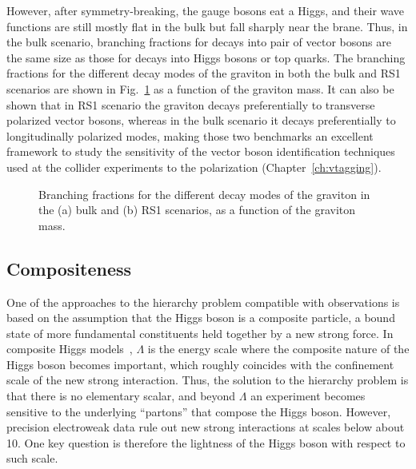 However, after symmetry-breaking, the gauge bosons eat a Higgs, and their wave functions are still mostly flat in the bulk but fall sharply near the brane.
Thus, in the bulk scenario, branching fractions for decays into pair of vector bosons are the same size as those for decays into Higgs bosons or top quarks.
The branching fractions for the different decay modes of the graviton in both the bulk and RS1 scenarios are shown in Fig.~\ref{fig:GrBR} as a function of the graviton mass.
It can also be shown that in RS1 scenario the graviton decays preferentially to transverse polarized vector bosons, whereas in the bulk scenario it decays preferentially to longitudinally polarized modes, making those two benchmarks an excellent framework to study the sensitivity of the vector boson identification techniques used at the collider experiments to the polarization (Chapter~\ref{ch:vtagging}).

\begin{figure}[!htb]
\centering
{}
\caption{Branching fractions for the different decay modes of the graviton in the (a) bulk and (b) RS1 scenarios, as a function of the graviton mass.}
\label{fig:GrBR}
\end{figure}

\subsection{Compositeness}\label{subsec:composite}

One of the approaches to the hierarchy problem compatible with observations is based on the assumption that the Higgs boson is a composite particle, a bound state of more fundamental constituents held together by a new strong force.
In composite Higgs models~\cite{Composite0,Composite1,Composite2}, $\Lambda$ is the energy scale where the composite nature of the Higgs boson becomes important, which roughly coincides with the confinement scale of the new strong interaction. Thus, the solution to the hierarchy problem is that there is no elementary scalar, and beyond $\Lambda$ an experiment becomes sensitive to the underlying ``partons'' that compose the Higgs boson. 
However, precision electroweak data rule out new strong interactions at scales below about 10\TeV.
One key question is therefore the lightness of the Higgs boson with respect to such scale.

